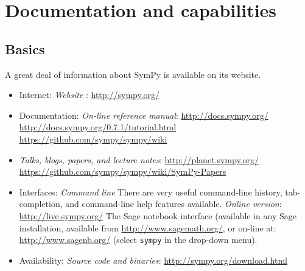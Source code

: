 \documentclass[12pt]{article}
\begin{document}
\section{Documentation and capabilities}



\subsection{Basics}

A great deal of information about SymPy is available on its website. 


\begin{itemize}
\item
Internet:
\newline
{\it Website} :
\newline
\url{http://sympy.org/}


\item
Documentation:
\newline
{\it On-line reference manual}: 
\newline
\url{http://docs.sympy.org/}
\newline
\url{http://docs.sympy.org/0.7.1/tutorial.html}
\newline
\url{https://github.com/sympy/sympy/wiki}

\item
{\it Talks, blogs, papers, and lecture notes}:
\newline
\url{http://planet.sympy.org/}
\newline
\url{https://github.com/sympy/sympy/wiki/SymPy-Papers}

\item
Interfaces:
\newline
{\it Command line}
\newline
There are very useful command-line history, tab-completion, and
command-line help features available.
\newline
{\it Online version}:
\newline
\url{http://live.sympy.org/}
\newline
The Sage notebook interface (available in any Sage installation,
available from \url{http://www.sagemath.org/}, or on-line at:
\url{http://www.sagenb.org/} (select {\tt sympy} in the drop-down menu).
\item
Availability:
\newline
{\it Source code and binaries}:
\url{http://sympy.org/download.html}


\end{itemize}
\end{document}
